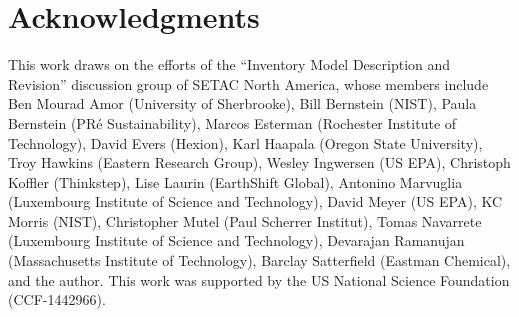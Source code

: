   \section*{Acknowledgments}

  This work draws on the efforts of the ``Inventory Model Description and Revision'' discussion group of SETAC North America, whose members include Ben Mourad Amor (University of Sherbrooke), Bill Bernstein (NIST), Paula Bernstein (PR\'e Sustainability), Marcos Esterman (Rochester Institute of Technology), David Evers (Hexion), Karl Haapala (Oregon State University), Troy Hawkins (Eastern Research Group), Wesley Ingwersen (US EPA), Christoph Koffler (Thinkstep), Lise Laurin (EarthShift Global), Antonino Marvuglia (Luxembourg Institute of Science and Technology), David Meyer (US EPA), KC Morris (NIST), Christopher Mutel (Paul Scherrer Institut), Tomas Navarrete (Luxembourg Institute of Science and Technology), Devarajan Ramanujan (Massachusetts Institute of Technology), Barclay Satterfield (Eastman Chemical), and the author.  This work was supported by the US National Science Foundation (CCF-1442966).
